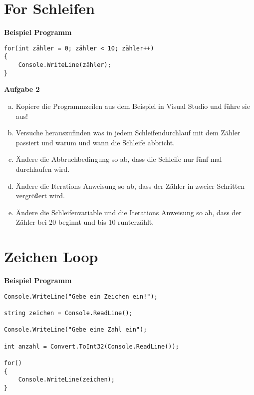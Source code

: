 \documentclass[a4paper,12pt]{article}
\newcommand{\Aufgabe}[1]{
  {
  \vspace*{0.5cm}
  \textsf{\textbf{Aufgabe #1}}
  \vspace*{0.2cm}
  
  }
}
\newcommand{\Definition}[1]{
  {
  \vspace*{0.5cm}
  \textsf{\textbf{#1}}
  \vspace*{0.2cm}
  
  }
}
\begin{document}
\section{For Schleifen}
\Definition{Beispiel Programm}

\begin{verbatim}
for(int zähler = 0; zähler < 10; zähler++)
{
    Console.WriteLine(zähler);
}
\end{verbatim}

\Aufgabe{2} 
\begin{enumerate}[a)]
\item
Kopiere die Programmzeilen aus dem Beispiel in Visual Studio und führe sie aus!
\item 
Versuche herauszufinden was in jedem Schleifendurchlauf mit dem Zähler passiert und warum und wann die Schleife abbricht. 
\item
Ändere die Abbruchbedingung so ab, dass die Schleife nur fünf mal durchlaufen wird.
\item
Ändere die Iterations Anweisung so ab, dass der Zähler in zweier Schritten vergrößert wird.
\item
Ändere die Schleifenvariable und die Iterations Anweisung so ab, dass der Zähler bei 20 beginnt und bis 10 runterzählt.
\end{enumerate}

\section{Zeichen Loop}
\Definition{Beispiel Programm}

\begin{verbatim}
Console.WriteLine("Gebe ein Zeichen ein!");

string zeichen = Console.ReadLine();

Console.WriteLine("Gebe eine Zahl ein");

int anzahl = Convert.ToInt32(Console.ReadLine());

for()
{
    Console.WriteLine(zeichen);
}
\end{verbatim}
\end{document}
